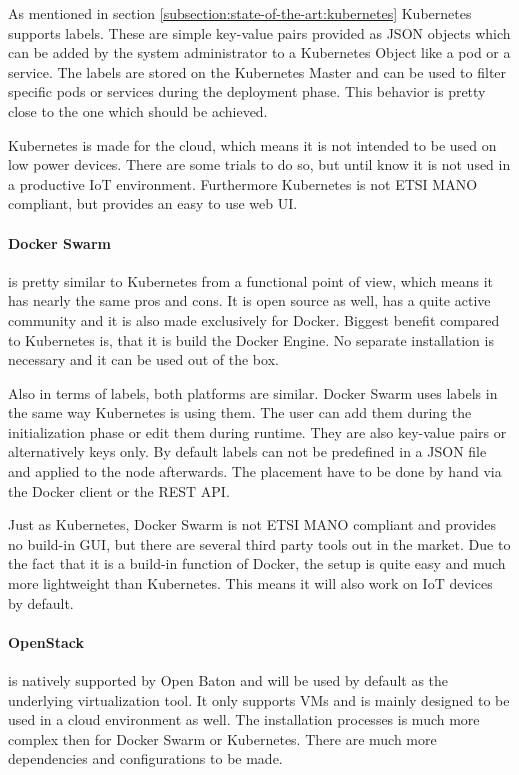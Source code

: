 As mentioned in section \ref{subsection:state-of-the-art:kubernetes} Kubernetes supports labels.
These are simple key-value pairs provided as \ac{JSON} objects which can be added by the system administrator to a Kubernetes Object like a pod or a service.
The labels are stored on the Kubernetes Master and can be used to filter specific pods or services during the deployment phase.
This behavior is pretty close to the one which should be achieved.

Kubernetes is made for the cloud, which means it is not intended to be used on low power devices.
There are some trials to do so, but until know it is not used in a productive \ac{IoT} environment.
Furthermore Kubernetes is not \ac{ETSI} \ac{MANO} compliant, but provides an easy to use web \ac{UI}.

\paragraph{Docker Swarm} is pretty similar to Kubernetes from a functional point of view, which means it has nearly the same pros and cons.
It is open source as well, has a quite active community and it is also made exclusively for Docker.
Biggest benefit compared to Kubernetes is, that it is build the Docker Engine.
No separate installation is necessary and it can be used out of the box.

Also in terms of labels, both platforms are similar.
Docker Swarm uses labels in the same way Kubernetes is using them.
The user can add them during the initialization phase or edit them during runtime.
They are also key-value pairs or alternatively keys only.
By default labels can not be predefined in a \ac{JSON} file and applied to the node afterwards.
The placement have to be done by hand via the Docker client or the \ac{REST} \ac{API}.

Just as Kubernetes, Docker Swarm is not \ac{ETSI} \ac{MANO} compliant and provides no build-in \ac{GUI}, but there are several third party tools out in the market.
Due to the fact that it is a build-in function of Docker, the setup is quite easy and much more lightweight than Kubernetes.
This means it will also work on \ac{IoT} devices by default.

\paragraph{OpenStack} is natively supported by Open Baton and will be used by default as the underlying virtualization tool.
It only supports \acp{VM} and is mainly designed to be used in a cloud environment as well.
The installation processes is much more complex then for Docker Swarm or Kubernetes.
There are much more dependencies and configurations to be made.

